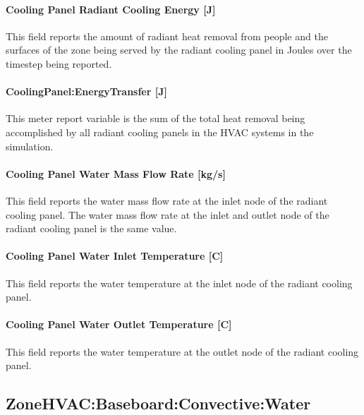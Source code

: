 \paragraph{Cooling Panel Radiant Cooling Energy [J]}\label{cooling-panel-radiant-cooling-energy-j}

This field reports the amount of radiant heat removal from people and the surfaces of the zone being served by the radiant cooling panel in Joules over the timestep being reported.

\paragraph{CoolingPanel:EnergyTransfer [J]}\label{coolingpanel-energytransfer-j}

This meter report variable is the sum of the total heat removal being accomplished by all radiant cooling panels in the HVAC systems in the simulation.

\paragraph{Cooling Panel Water Mass Flow Rate [kg/s]}\label{cooling-panel-water-mass-flow-rate-kgs}

This field reports the water mass flow rate at the inlet node of the radiant cooling panel.  The water mass flow rate at the inlet and outlet node of the radiant cooling panel is the same value.

\paragraph{Cooling Panel Water Inlet Temperature [C]}\label{cooling-panel-water-inlet-temperature-c}

This field reports the water temperature at the inlet node of the radiant cooling panel.

\paragraph{Cooling Panel Water Outlet Temperature [C]}\label{cooling-panel-water-outlet-temperature-c}

This field reports the water temperature at the outlet node of the radiant cooling panel.

\subsection{ZoneHVAC:Baseboard:Convective:Water}\label{zonehvacbaseboardconvectivewater}

